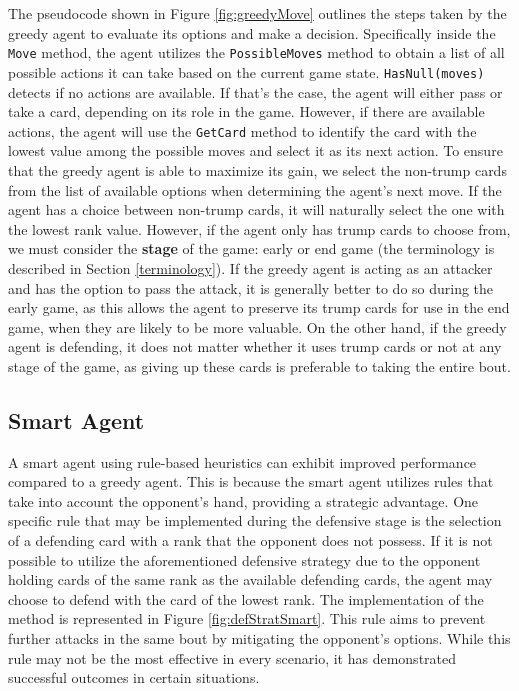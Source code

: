The pseudocode shown in Figure \ref{fig:greedyMove} outlines the steps taken by the greedy agent to evaluate its options and make a decision. Specifically inside the \texttt{Move} method, the agent utilizes the \texttt{PossibleMoves} method to obtain a list of all possible actions it can take based on the current game state. \texttt{HasNull(moves)} detects if no actions are available. If that's the case, the agent will either pass or take a card, depending on its role in the game. However, if there are available actions, the agent will use the \texttt{GetCard} method to identify the card with the lowest value among the possible moves and select it as its next action. To ensure that the greedy agent is able to maximize its gain, we select the non-trump cards from the list of available options when determining the agent's next move. If the agent has a choice between non-trump cards, it will naturally select the one with the lowest rank value. However, if the agent only has trump cards to choose from, we must consider the \textbf{stage} of the game: early or end game (the terminology is described in Section \ref{terminology}). If the greedy agent is acting as an attacker and has the option to pass the attack, it is generally better to do so during the early game, as this allows the agent to preserve its trump cards for use in the end game, when they are likely to be more valuable. On the other hand, if the greedy agent is defending, it does not matter whether it uses trump cards or not at any stage of the game, as giving up these cards is preferable to taking the entire bout.

\subsection{Smart Agent}
\label{smart}
A smart agent using rule-based heuristics can exhibit improved performance compared to a greedy agent. This is because the smart agent utilizes rules that take into account the opponent's hand, providing a strategic advantage. One specific rule that may be implemented during the defensive stage is the selection of a defending card with a rank that the opponent does not possess. If it is not possible to utilize the aforementioned defensive strategy due to the opponent holding cards of the same rank as the available defending cards, the agent may choose to defend with the card of the lowest rank.  The implementation of the method is represented in Figure \ref{fig:defStratSmart}. This rule aims to prevent further attacks in the same bout by mitigating the opponent's options. While this rule may not be the most effective in every scenario, it has demonstrated successful outcomes in certain situations.

